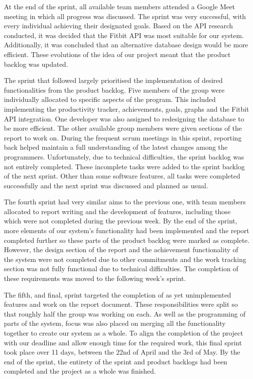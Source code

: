 \documentclass[11pt]{article}
\begin{document}
At the end of the sprint, all available team members attended a Google Meet
meeting in which all progress was discussed. The sprint was very successful,
with every individual achieving their designated goals. Based on the API
research conducted, it was decided that the Fitbit API was most suitable for
our system. Additionally, it was concluded that an alternative database design
would be more efficient. These evolutions of the idea of our project meant that
the product backlog was updated.\par

The sprint that followed largely prioritised the implementation of desired
functionalities from the product backlog. Five members of the group were
individually allocated to specific aspects of the program. This included
implementing the productivity tracker, achievements, goals, graphs and the
Fitbit API integration. One developer was also assigned to redesigning the
database to be more efficient. The other available group members were given
sections of the report to work on. During the frequent scrum meetings in this
sprint, reporting back helped maintain a full understanding of the latest
changes among the programmers. Unfortunately, due to technical difficulties,
the sprint backlog was not entirely completed. These incomplete tasks were
added to the sprint backlog of the next sprint. Other than some software
features, all tasks were completed successfully and the next sprint was
discussed and planned as usual.\par

The fourth sprint had very similar aims to the previous one, with team members
allocated to report writing and the development of features, including those
which were not completed during the previous week. By the end of the sprint,
more elements of our system's functionality had been implemented and the report
completed further so these parts of the product backlog were marked as
complete. However, the design section of the report and the achievement
functionality of the system were not completed due to other commitments and the
work tracking section was not fully functional due to technical difficulties.
The completion of these requirements was moved to the following week's
sprint.\par


The fifth, and final, sprint targeted the completion of as yet unimplemented
features and work on the report document. These responsibilities were split so
that roughly half the group was working on each. As well as the programming of
parts of the system, focus was also placed on merging all the functionality
together to create our system as a whole. To align the completion of the 
project with our deadline and allow enough time for the required work, this 
final sprint took place over 11 days, between the 22nd of April and the 3rd of 
May. By the end of the sprint, the entirety of the sprint and product 
backlogs had been completed and the project as a whole was finished.\par
\end{document}
